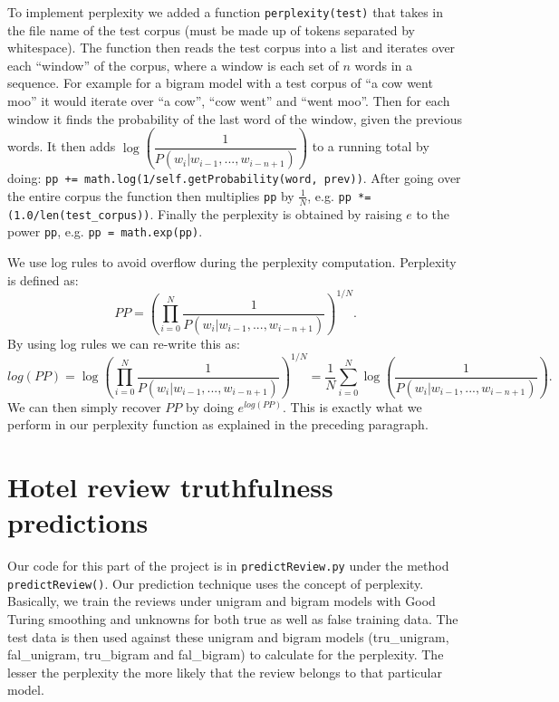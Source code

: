 \documentclass{article}
\begin{document}
To implement perplexity we added a function \texttt{perplexity(test)} that takes in the file name of the test corpus (must be made up of tokens separated by whitespace). The function then reads the test corpus into a list and iterates over each ``window'' of the corpus, where a window is each set of $n$ words in a sequence. For example for a bigram model with a test corpus of ``a cow went moo'' it would iterate over ``a cow'', ``cow went'' and ``went moo''. Then for each window it finds the probability of the last word of the window, given the previous words. It then adds $\log\left(\dfrac{1}{P(w_i|w_{i-1},...,w_{i-n+1})}\right)$ to a running total by doing: \texttt{pp += math.log(1/self.getProbability(word, prev))}. After going over the entire corpus the function then multiplies \texttt{pp} by $\frac{1}{N}$, e.g. \texttt{pp *= (1.0/len(test\_corpus))}. Finally the perplexity is obtained by raising $e$ to the power \texttt{pp}, e.g. \texttt{pp = math.exp(pp)}.

We use log rules to avoid overflow during the perplexity computation.
Perplexity is defined as:
\[PP=\left(\prod_{i=0}^N\frac{1}{P(w_i|w_{i-1},...,w_{i-n+1})}\right)^{1/N}.\]
By using log rules we can re-write this as:
\[log(PP) = \log\left(\prod_{i=0}^N\frac{1}{P(w_i|w_{i-1},...,w_{i-n+1})}\right)^{1/N} = \frac{1}{N}\sum_{i=0}^N \log\left(\frac{1}{P(w_i|w_{i-1},...,w_{i-n+1})}\right).\] We can then simply recover $PP$ by doing $e^{log(PP)}$. This is exactly what we perform in our perplexity function as explained in the preceding paragraph.

\section{Hotel review truthfulness predictions} %
Our code for this part of the project is in \texttt{predictReview.py} under the method \texttt{predictReview()}. Our prediction technique uses the concept of perplexity. Basically, we train the reviews under unigram and bigram models with Good Turing smoothing and unknowns for both true as well as false training data. The test data is then used against these unigram and bigram models (tru\_unigram, fal\_unigram, tru\_bigram and fal\_bigram) to calculate for the perplexity. The lesser the perplexity the more likely that the review belongs to that particular model. \par
\end{document}
